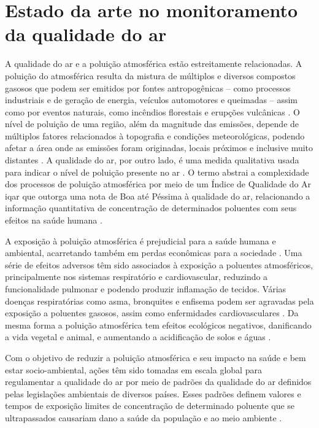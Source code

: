 \chapter{Estado da arte no monitoramento da qualidade do ar}\label{cap:air-quality-monitoring}

A qualidade do ar e a poluição atmosférica estão estreitamente relacionadas. A poluição do atmosférica resulta da mistura de múltiplos e diversos compostos gasosos que podem ser emitidos por fontes antropogênicas – como processos industriais e de geração de energia, veículos automotores e queimadas – assim como por eventos naturais, como incêndios florestais e erupções vulcânicas \cite{MMA2020QualidadeAr}. O nível de poluição de uma região, além da magnitude das emissões, depende de múltiplos fatores relacionados à topografia e condições meteorológicas, podendo afetar a área onde as emissões foram originadas, locais próximos e inclusive muito distantes \cite{MMA2020QualidadeAr,Williams2014AirGuidebook}. A qualidade do ar, por outro lado, é uma medida qualitativa usada para indicar o nível de poluição presente no ar \cite{Williams2014AirGuidebook}. O termo abstrai a complexidade dos processos de poluição atmosférica por meio de um Índice de Qualidade do Ar \gls{iqar} que outorga uma nota de Boa até Péssima à qualidade do ar, relacionando a informação quantitativa de concentração de determinados poluentes com seus efeitos na saúde humana \cite{Franca2019GUIAAR}.

A exposição à poluição atmosférica é prejudicial para a saúde humana e ambiental, acarretando também em perdas econômicas para a sociedade \cite{who2021}. Uma série de efeitos adversos têm sido associados à exposição a poluentes atmosféricos, principalmente nos sistemas respiratório e cardiovascular, reduzindo a funcionalidade pulmonar e podendo produzir inflamação de tecidos. Várias doenças respiratórias como asma, bronquites e enfisema podem ser agravadas pela exposição a poluentes gasosos, assim como enfermidades cardiovasculares \cite{Williams2014AirGuidebook,who2021}. Da mesma forma a poluição atmosférica tem efeitos ecológicos negativos, danificando a vida vegetal e animal, e aumentando a acidificação de solos e águas \cite{MMA2020QualidadeAr,Williams2014AirGuidebook}.

Com o objetivo de reduzir a poluição atmosférica e seu impacto na saúde e bem estar socio-ambiental, ações têm sido tomadas em escala global para regulamentar a qualidade do ar por meio de padrões da qualidade do ar definidos pelas legislações ambientais de diversos países. Esses padrões definem valores e tempos de exposição limites de concentração de determinado poluente que se ultrapassados causariam dano a saúde da população e ao meio ambiente \cite{CONAMA2018}.

